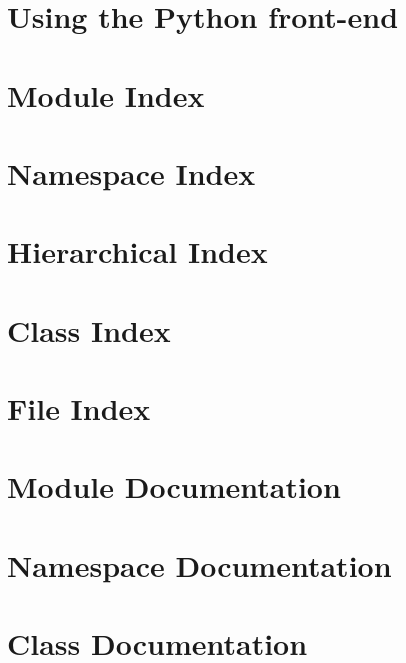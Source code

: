 \documentclass[twoside]{book}
\begin{document}
\chapter{Using the Python front-\/end}
\label{using_python}

\chapter{Module Index}

\chapter{Namespace Index}

\chapter{Hierarchical Index}

\chapter{Class Index}

\chapter{File Index}

\chapter{Module Documentation}















\chapter{Namespace Documentation}

\chapter{Class Documentation}













\end{document}
